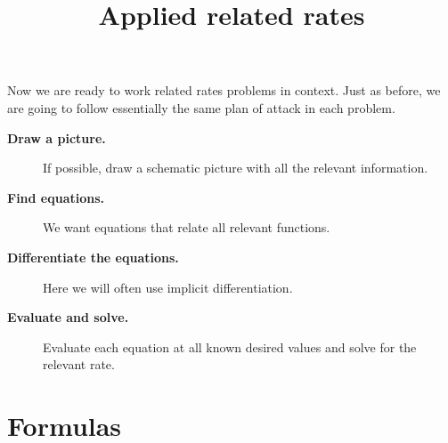 \documentclass{ximera}
\title[Dig-In:]{Applied related rates}
\begin{document}
\begin{abstract}
\end{abstract}
\maketitle

Now we are ready to work related rates problems in context. Just as
before, we are going to follow essentially the same plan of attack in
each problem.


\begin{description}
\item[\textbf{Draw a picture.}] If possible, draw a schematic picture with all the relevant information. 
\item[\textbf{Find equations.}] We want equations that relate all
  relevant functions.
\item[\textbf{Differentiate the equations.}] Here we will often use
  implicit differentiation.
\item[\textbf{Evaluate and solve.}] Evaluate
  each equation at all known desired values and solve for the relevant
  rate.
\end{description}



\section{Formulas}
\end{document}
